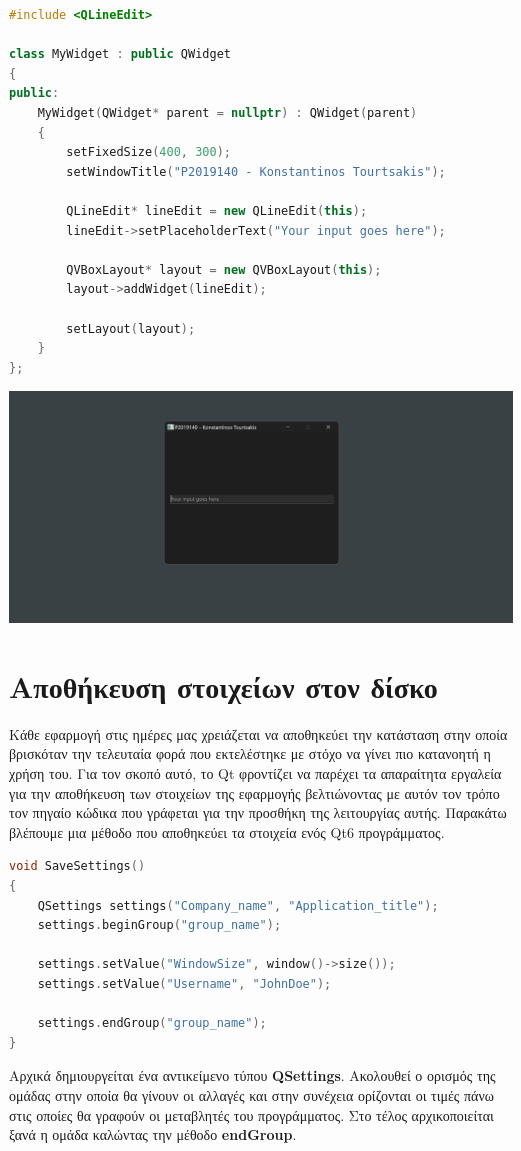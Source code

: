 \begin{lstlisting}[language=C++, style=cppstyle]
#include <QLineEdit>

class MyWidget : public QWidget 
{
public:
    MyWidget(QWidget* parent = nullptr) : QWidget(parent) 
    {
        setFixedSize(400, 300);
        setWindowTitle("P2019140 - Konstantinos Tourtsakis");

        QLineEdit* lineEdit = new QLineEdit(this);
        lineEdit->setPlaceholderText("Your input goes here");
        
        QVBoxLayout* layout = new QVBoxLayout(this);
        layout->addWidget(lineEdit);

        setLayout(layout);
    }
};
\end{lstlisting}
\includegraphics[width=1.0\textwidth]{./images/QLineEdit.png}


\section{Αποθήκευση στοιχείων στον δίσκο}
Κάθε εφαρμογή στις ημέρες μας χρειάζεται να αποθηκεύει την κατάσταση στην οποία
βρισκόταν την τελευταία φορά που εκτελέστηκε με στόχο να γίνει πιο κατανοητή η
χρήση του. Για τον σκοπό αυτό, το Qt φροντίζει να παρέχει τα απαραίτητα εργαλεία
για την αποθήκευση των στοιχείων της εφαρμογής βελτιώνοντας με αυτόν τον τρόπο
τον πηγαίο κώδικα που γράφεται για την προσθήκη της λειτουργίας αυτής. Παρακάτω
βλέπουμε μια μέθοδο που αποθηκεύει τα στοιχεία ενός Qt6 προγράμματος.


\begin{lstlisting}[language=C++, style=cppstyle]
void SaveSettings()
{
    QSettings settings("Company_name", "Application_title");
    settings.beginGroup("group_name");

    settings.setValue("WindowSize", window()->size());
    settings.setValue("Username", "JohnDoe");

    settings.endGroup("group_name");
}

\end{lstlisting}
Αρχικά δημιουργείται ένα αντικείμενο τύπου \textbf{QSettings}. Ακολουθεί ο ορισμός
της ομάδας στην οποία θα γίνουν οι αλλαγές και στην συνέχεια ορίζονται
οι τιμές πάνω στις οποίες θα γραφούν οι μεταβλητές του προγράμματος. Στο τέλος
αρχικοποιείται ξανά η ομάδα καλώντας την μέθοδο \textbf{endGroup}.

